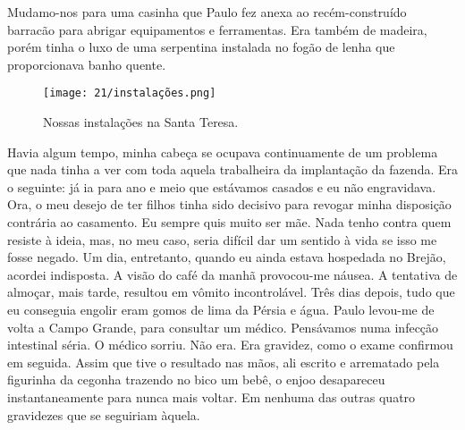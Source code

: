 Mudamo-nos para uma casinha que Paulo fez anexa ao recém-construído barracão para abrigar equipamentos e ferramentas.
Era também de madeira, porém tinha o luxo de uma serpentina instalada no fogão de lenha que proporcionava banho quente.

\begin{figure}
\centering
\texttt{[image: 21/instalações.png]}
\caption{Nossas instalações na Santa Teresa.}
\end{figure}

Havia algum tempo, minha cabeça se ocupava continuamente de um problema que nada tinha a ver com toda aquela trabalheira da implantação da fazenda.
Era o seguinte: já ia para ano e meio que estávamos casados e eu não engravidava.
Ora, o meu desejo de ter filhos tinha sido decisivo para revogar minha disposição contrária ao casamento.
Eu sempre quis muito ser mãe.
Nada tenho contra quem resiste à ideia, mas, no meu caso, seria difícil dar um sentido à vida se isso me fosse negado.
Um dia, entretanto, quando eu ainda estava hospedada no Brejão, acordei indisposta.
A visão do café da manhã provocou-me náusea.
A tentativa de almoçar, mais tarde, resultou em vômito incontrolável.
Três dias depois, tudo que eu conseguia engolir eram gomos de lima da Pérsia e água.
Paulo levou-me de volta a Campo Grande, para consultar um médico.
Pensávamos numa infecção intestinal séria.
O médico sorriu.
Não era.
Era gravidez, como o exame confirmou em seguida.
Assim que tive o resultado nas mãos, ali escrito e arrematado pela figurinha da cegonha trazendo no bico um bebê, o enjoo desapareceu instantaneamente para nunca mais voltar.
Em nenhuma das outras quatro gravidezes que se seguiriam àquela.
